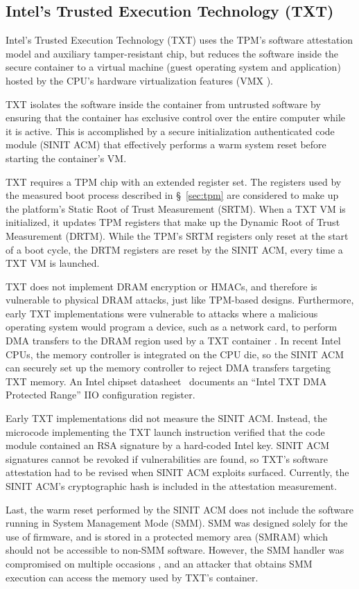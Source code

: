 \subsection{Intel's Trusted Execution Technology (TXT)}
\label{sec:intel_txt}

Intel's Trusted Execution Technology (TXT) \cite{grawrock2009txt} uses the
TPM's software attestation model and auxiliary tamper-resistant chip, but
reduces the software inside the secure container to a virtual machine (guest
operating system and application) hosted by the CPU's hardware virtualization
features (VMX \cite{uhlig2005vmx}).

TXT isolates the software inside the container from untrusted software by
ensuring that the container has exclusive control over the entire computer
while it is active. This is accomplished by a secure initialization
authenticated code module (SINIT ACM) that effectively performs a warm system
reset before starting the container's VM.

TXT requires a TPM chip with an extended register set. The registers used by
the measured boot process described in \S~\ref{sec:tpm} are considered to make
up the platform's Static Root of Trust Measurement (SRTM). When a TXT VM is
initialized, it updates TPM registers that make up the Dynamic Root of Trust
Measurement (DRTM). While the TPM's SRTM registers only reset at the start of a
boot cycle, the DRTM registers are reset by the SINIT ACM, every time a TXT VM
is launched.

TXT does not implement DRAM encryption or HMACs, and therefore is vulnerable to
physical DRAM attacks, just like TPM-based designs. Furthermore, early TXT
implementations were vulnerable to attacks where a malicious operating system
would program a device, such as a network card, to perform DMA transfers
to the DRAM region used by a TXT container \cite{wojtczuk2009txt,
wojtczuk2009txt2}. In recent Intel CPUs, the memory controller is integrated on
the CPU die, so the SINIT ACM can securely set up the memory controller to
reject DMA transfers targeting TXT memory. An Intel chipset
datasheet~\cite{intel2015datasheet} documents an ``Intel TXT DMA Protected
Range'' IIO configuration register.

Early TXT implementations did not measure the SINIT ACM. Instead, the microcode
implementing the TXT launch instruction verified that the code module contained
an RSA signature by a hard-coded Intel key. SINIT ACM signatures cannot be
revoked if vulnerabilities are found, so TXT's software attestation had to be
revised when SINIT ACM exploits \cite{wojtczuk2011txt} surfaced. Currently, the
SINIT ACM's cryptographic hash is included in the attestation measurement.

Last, the warm reset performed by the SINIT ACM does not include the software
running in System Management Mode (SMM). SMM was designed
solely for the use of firmware, and is stored in a protected memory area
(SMRAM) which should not be accessible to non-SMM software. However, the SMM
handler was compromised on multiple occasions \cite{duflot2006smm,
rutkowska2008remap, wojtczuk2009smm, wecherowski2009smm, embleton2010smm}, and
an attacker that obtains SMM execution can access the memory used by TXT's
container.

